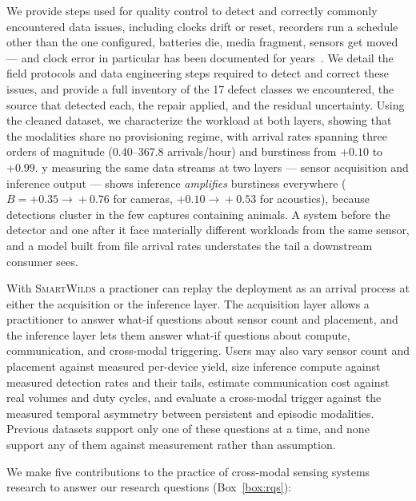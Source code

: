 \documentclass[sigconf]{acmart}
\newcommand{\smartwilds}{\textsc{SmartWilds}\xspace}
\begin{document}
We provide steps used for quality control to detect and correctly commonly encountered data issues, including  clocks drift or reset, recorders run a
schedule other than the one configured, batteries die, media fragment,
sensors get moved --- and clock error in particular has been documented
for years~\cite{lahozmonfort2021monitoring,ahumada2020wildlifeinsights}. 
We detail the field protocols and data engineering steps required to detect and correct these issues, and provide a full inventory of the 17 defect classes we encountered, the source that detected each, the repair applied, and the residual uncertainty.
%
Using the cleaned dataset, we characterize the workload at both layers, showing that the modalities share no provisioning regime, with arrival rates spanning three orders of magnitude (0.40--367.8 arrivals/hour) and burstiness from $+0.10$ to $+0.99$.
y measuring the same data streams at two layers --- sensor
acquisition and inference output --- shows inference \emph{amplifies}
burstiness everywhere ($B{=}+0.35\!\to\!+0.76$ for cameras,
$+0.10\!\to\!+0.53$ for acoustics), because detections cluster in the
few captures containing animals. A system before the detector and one
after it face materially different workloads from the same sensor, and a
model built from file arrival rates understates the tail a downstream
consumer sees.


With \smartwilds a practioner can replay the deployment as an arrival
process at either the acquisition or the inference layer.
The acquisition layer allows a practitioner to answer what-if questions about sensor count and placement, and the inference layer lets them answer what-if questions about compute, communication, and cross-modal triggering.
Users may also vary sensor count and placement against measured per-device yield, size inference
compute against measured detection rates and their tails, estimate
communication cost against real volumes and duty cycles, and evaluate a
cross-modal trigger against the measured temporal asymmetry between
persistent and episodic modalities. 
Previous datasets support only one of these questions at a time, and none support any of them against measurement rather than assumption.


We make five contributions to the practice of cross-modal sensing systems research to answer our research questions (Box~\ref{box:rqs}):
\end{document}
